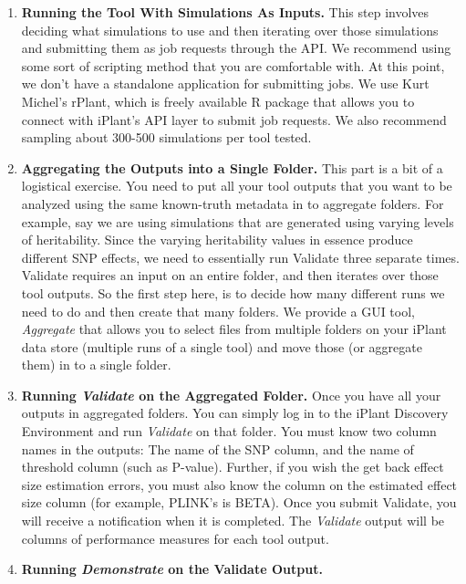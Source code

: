 \documentclass[twoside,a4paper]{refart}
\begin{document}
\begin{enumerate}
\item \textbf{Running the Tool With Simulations As Inputs.}
This step involves deciding what simulations to use and then iterating over those simulations and submitting them as job requests through the API. We recommend using some sort of scripting method that you are comfortable with. At this point, we don't have a standalone application for submitting jobs. We use Kurt Michel's rPlant, which is freely available R package that allows you to connect with iPlant's API layer to submit job requests. We also recommend sampling about 300-500 simulations per tool tested.
\item \textbf{Aggregating the Outputs into a Single Folder.}
This part is a bit of a logistical exercise. You need to put all your tool outputs that you want to be analyzed using the same known-truth metadata in to aggregate folders. For example, say we are using simulations that are generated using varying levels of heritability. Since the varying heritability values in essence produce different SNP effects, we need to essentially run Validate three separate times. Validate requires an input on an entire folder, and then iterates over those tool outputs. So the first step here, is to decide how many different runs we need to do and then create that many folders. We provide a GUI tool, \textit{Aggregate} that allows you to select files from multiple folders on your iPlant data store (multiple runs of a single tool) and move those (or aggregate them) in to a single folder.
\item \textbf{Running \textit{Validate} on the Aggregated Folder.}
Once you have all your outputs in aggregated folders. You can simply log in to the iPlant Discovery Environment and run \textit{Validate} on that folder. You must know two column names in the outputs: The name of the SNP column, and the name of threshold column (such as P-value). Further, if you wish the get back effect size estimation errors, you must also know the column on the estimated effect size column (for example, PLINK's is BETA). Once you submit Validate, you will receive a notification when it is completed. The \textit{Validate} output will be columns of performance measures for each tool output.
\item \textbf{Running \textit{Demonstrate} on the Validate Output.}
\end{enumerate}
\end{document}
